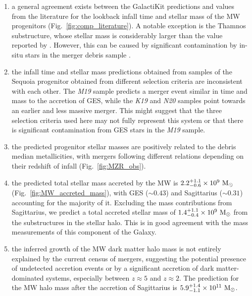 \begin{enumerate}
    \item a general agreement exists between the GalactiKit predictions and values from the literature for the lookback infall time and stellar mass of the MW progenitors (Fig.~\ref{fig:comp_literature}). A notable exception is the Thamnos substructure, whose stellar mass is considerably larger than the value reported by \citet{Koppelman2019}. However, this can be caused by significant contamination by in-situ stars in the merger debris sample \citep{Ceccarelli2025}.
    \item the infall time and stellar mass predictions obtained from samples of the Sequoia progenitor obtained from different selection criteria are inconsistent with each other. The \textit{M19} sample predicts a merger event similar in time and mass to the accretion of GES, while the \textit{K19} and \textit{N20} samples point towards an earlier and less massive merger. This might suggest that the three selection criteria used here may not fully represent this system or that there is significant contamination from GES stars in the \textit{M19} sample. 
    \item the predicted progenitor stellar masses are positively related to the debris median metallicities, with mergers following different relations depending on their redshift of infall (Fig.~\ref{fig:MZR_obs}). 
    \item the predicted total stellar mass accreted by the MW is $2.2^{+1.1}_{-0.6} \times 10^{9}~\rm{M_{\ensuremath{\odot}}}$ (Fig.~\ref{fig:MW_accreted_mass}), with GES ($\sim0.43$) and Sagittarius ($\sim0.31$) accounting for  the majority of it. Excluding the mass contributions from Sagittarius, we predict a total accreted stellar mass of $1.4^{+1.1}_{-0.4} \times 10^{9}~\rm{M_{\ensuremath{\odot}}}$ from the substructures in the stellar halo. This is in good agreement with the mass measurements of this component of the Galaxy.
    \item the inferred growth of the MW dark matter halo mass is not entirely explained by the current census of mergers, suggesting the potential presence of undetected accretion events or by a significant accretion of dark matter-dominated systems, especially between $z\approx5$ and $z\approx2$. The prediction for the MW halo mass after the accretion of Sagittarius
    is $5.9^{+1.4}_{-1.1} \times 10^{11}~\rm{M_{\ensuremath{\odot}}}$.  
\end{enumerate}

